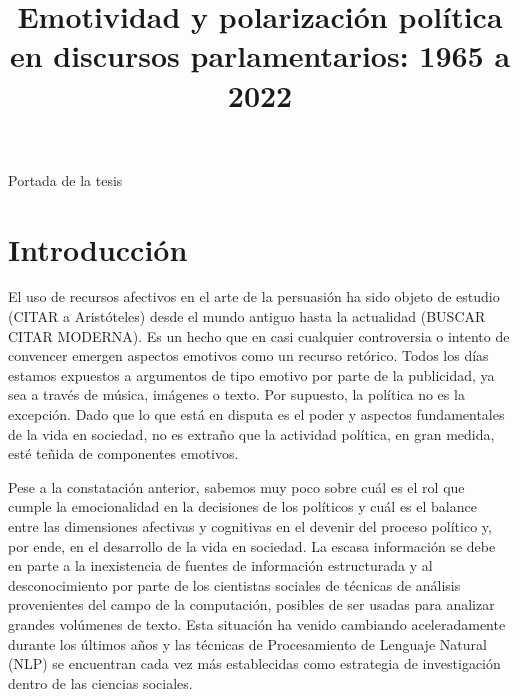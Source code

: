 \documentclass[
  12pt,
]{article}
\title{Emotividad y polarización política en discursos parlamentarios:
1965 a 2022}
\author{}
\date{\vspace{-2.5em}}
\begin{document}
\maketitle

Portada de la tesis

\newpage

\newpage
\begin{spacing}{0.9} 
\tableofcontents
\end{spacing}

\newpage

\begin{spacing}{0.9} 
\listoftables
\end{spacing}

\newpage
\listoffigures
\newpage
\normalsize

\hypertarget{introducciuxf3n}{%
\section{Introducción}\label{introducciuxf3n}}

El uso de recursos afectivos en el arte de la persuasión ha sido objeto
de estudio (CITAR a Aristóteles) desde el mundo antiguo hasta la
actualidad (BUSCAR CITAR MODERNA). Es un hecho que en casi cualquier
controversia o intento de convencer emergen aspectos emotivos como un
recurso retórico. Todos los días estamos expuestos a argumentos de tipo
emotivo por parte de la publicidad, ya sea a través de música, imágenes
o texto. Por supuesto, la política no es la excepción. Dado que lo que
está en disputa es el poder y aspectos fundamentales de la vida en
sociedad, no es extraño que la actividad política, en gran medida, esté
teñida de componentes emotivos.

Pese a la constatación anterior, sabemos muy poco sobre cuál es el rol
que cumple la emocionalidad en la decisiones de los políticos y cuál es
el balance entre las dimensiones afectivas y cognitivas en el devenir
del proceso político y, por ende, en el desarrollo de la vida en
sociedad. La escasa información se debe en parte a la inexistencia de
fuentes de información estructurada y al desconocimiento por parte de
los cientistas sociales de técnicas de análisis provenientes del campo
de la computación, posibles de ser usadas para analizar grandes
volúmenes de texto. Esta situación ha venido cambiando aceleradamente
durante los últimos años y las técnicas de Procesamiento de Lenguaje
Natural (NLP) se encuentran cada vez más establecidas como estrategia de
investigación dentro de las ciencias sociales.
\end{document}
